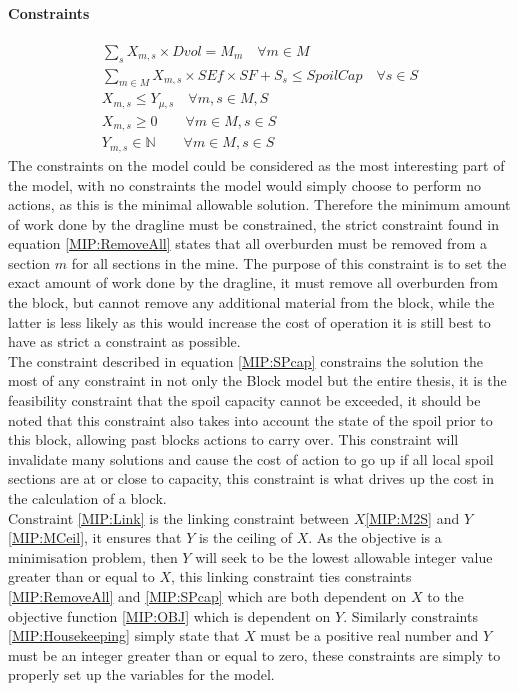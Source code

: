 \paragraph*{Constraints}
\begin{align}
\label{MIP:RemoveAll}
\sum_{s}X_{m,s}\times Dvol = M_{m}  \quad \forall m\in M  \\
\label{MIP:SPcap}
\sum_{m\in M} X_{m,s}\times SEf \times SF + S_s\leq SpoilCap \quad \forall s \in S \\ 
\label{MIP:Link}
X_{m,s} \leq Y_{\mu,s} \quad \forall m,s \in M,S\\
\label{MIP:Housekeeping}
X_{m,s} \geq 0 \qquad \forall m \in M , s \in S\\
Y_{m,s} \in \mathbb{N} \qquad \forall m \in M , s \in S
\end{align}
The constraints on the model could be considered as the most interesting part of the model, with no constraints the model would simply choose to perform no actions, as this is the minimal allowable solution. Therefore the minimum amount of work done by the dragline must be constrained, the strict constraint found in  equation \ref{MIP:RemoveAll} states that all overburden must be removed from a section $m$ for all sections in the mine. The purpose of this constraint is to set the exact amount of work done by the dragline, it must remove all overburden from the block, but cannot remove any additional material from the block, while the latter is less likely as this would increase the cost of operation it is still best to have as strict a constraint as possible. \\
The constraint described in equation \ref{MIP:SPcap} constrains the solution the most of any constraint in not only the Block model but the entire thesis, it is the feasibility constraint that the spoil capacity cannot be exceeded, it should be noted that this constraint also takes into account the state of the spoil prior to this block, allowing past blocks actions to carry over. This constraint will invalidate many solutions and cause the cost of action to go up if all local spoil sections are at or close to capacity, this constraint is what drives up the cost in the calculation of a block. 
\\ Constraint \ref{MIP:Link} is the linking constraint between $X$\ref{MIP:M2S} and $Y$\ref{MIP:MCeil}, it ensures that $Y$ is the ceiling of $X$. As the objective is a minimisation problem, then $Y$ will seek to be the lowest allowable integer value greater than or equal to $X$, this linking constraint ties constraints \ref{MIP:RemoveAll} and \ref{MIP:SPcap} which are both dependent on $X$ to the objective function \ref{MIP:OBJ} which is dependent on $Y$. Similarly constraints \ref{MIP:Housekeeping} simply state that $X$ must be a positive real number and $Y$ must be an integer greater than or equal to zero, these constraints are simply to properly set up the variables for the model. 
